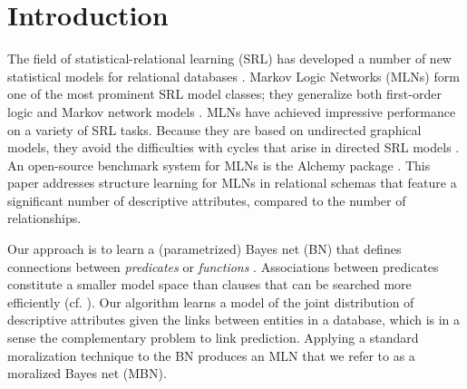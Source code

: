 \documentclass[letterpaper]{article}
\begin{document}
\section{Introduction}
The field of statistical-relational learning (SRL) has developed a number of new statistical models for relational databases \cite{SRL2007}. Markov Logic Networks (MLNs) form one of the most prominent SRL model classes; they generalize both first-order logic and Markov network models \cite{Domingos2007}. MLNs have achieved impressive performance on a variety of SRL tasks. Because they are based on undirected graphical models, they avoid the difficulties with cycles that arise in directed SRL models \cite{bib:jensen-chapter,Domingos2007,Taskar2002}.
An open-source benchmark system for MLNs is the Alchemy package \cite{Kok2009a}.
This paper addresses structure learning for MLNs in relational schemas that feature a significant number of descriptive attributes, compared to the number of relationships. 



Our approach is to learn a (parametrized) Bayes net (BN)  that defines connections between {\em predicates} or {\em functions} \cite{Poole2003}. Associations between predicates constitute a smaller model space than clauses that can be searched more efficiently (cf. \cite[10.7]{Kersting2007}). Our algorithm learns a model of the joint distribution of descriptive attributes given the links between entities in a database, which is in a sense the complementary problem to link prediction. Applying a standard moralization technique to the BN produces an MLN that we refer to as a moralized Bayes net (MBN).
\end{document}
